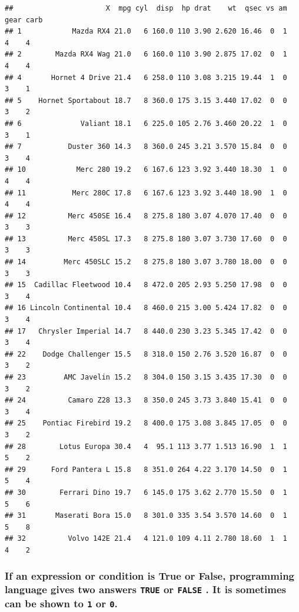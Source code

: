 \documentclass[
]{article}
\begin{document}
\begin{verbatim}
##                      X  mpg cyl  disp  hp drat    wt  qsec vs am gear carb
## 1            Mazda RX4 21.0   6 160.0 110 3.90 2.620 16.46  0  1    4    4
## 2        Mazda RX4 Wag 21.0   6 160.0 110 3.90 2.875 17.02  0  1    4    4
## 4       Hornet 4 Drive 21.4   6 258.0 110 3.08 3.215 19.44  1  0    3    1
## 5    Hornet Sportabout 18.7   8 360.0 175 3.15 3.440 17.02  0  0    3    2
## 6              Valiant 18.1   6 225.0 105 2.76 3.460 20.22  1  0    3    1
## 7           Duster 360 14.3   8 360.0 245 3.21 3.570 15.84  0  0    3    4
## 10            Merc 280 19.2   6 167.6 123 3.92 3.440 18.30  1  0    4    4
## 11           Merc 280C 17.8   6 167.6 123 3.92 3.440 18.90  1  0    4    4
## 12          Merc 450SE 16.4   8 275.8 180 3.07 4.070 17.40  0  0    3    3
## 13          Merc 450SL 17.3   8 275.8 180 3.07 3.730 17.60  0  0    3    3
## 14         Merc 450SLC 15.2   8 275.8 180 3.07 3.780 18.00  0  0    3    3
## 15  Cadillac Fleetwood 10.4   8 472.0 205 2.93 5.250 17.98  0  0    3    4
## 16 Lincoln Continental 10.4   8 460.0 215 3.00 5.424 17.82  0  0    3    4
## 17   Chrysler Imperial 14.7   8 440.0 230 3.23 5.345 17.42  0  0    3    4
## 22    Dodge Challenger 15.5   8 318.0 150 2.76 3.520 16.87  0  0    3    2
## 23         AMC Javelin 15.2   8 304.0 150 3.15 3.435 17.30  0  0    3    2
## 24          Camaro Z28 13.3   8 350.0 245 3.73 3.840 15.41  0  0    3    4
## 25    Pontiac Firebird 19.2   8 400.0 175 3.08 3.845 17.05  0  0    3    2
## 28        Lotus Europa 30.4   4  95.1 113 3.77 1.513 16.90  1  1    5    2
## 29      Ford Pantera L 15.8   8 351.0 264 4.22 3.170 14.50  0  1    5    4
## 30        Ferrari Dino 19.7   6 145.0 175 3.62 2.770 15.50  0  1    5    6
## 31       Maserati Bora 15.0   8 301.0 335 3.54 3.570 14.60  0  1    5    8
## 32          Volvo 142E 21.4   4 121.0 109 4.11 2.780 18.60  1  1    4    2
\end{verbatim}

\subsubsection{\texorpdfstring{If an expression or condition is True or
False, programming language gives two answers \texttt{TRUE} or
\texttt{FALSE} . It is sometimes can be shown to \texttt{1} or
\texttt{0}.}{If an expression or condition is True or False, programming language gives two answers TRUE or FALSE . It is sometimes can be shown to 1 or 0.}}\label{if-an-expression-or-condition-is-true-or-false-programming-language-gives-two-answers-true-or-false-.-it-is-sometimes-can-be-shown-to-1-or-0.}
\end{document}
